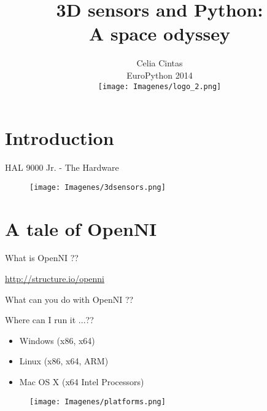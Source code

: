\documentclass[bigger]{beamer}
\begin{document}
\normalfont\ECFAugie

\title{3D sensors and Python:\\ A space odyssey \\[0.5cm]}
\subtitle{Celia Cintas \\[0.2cm] EuroPython 2014 \\[0.3cm]
\texttt{[image: Imagenes/logo\_2.png]}}

\begin{frame}
\titlepage
\end{frame}
\section{Introduction}


\begin{frame}[t]{\ECFAugie HAL 9000 Jr. - The Hardware}
\begin{figure}
		\texttt{[image: Imagenes/3dsensors.png]}
\end{figure}
\end{frame}

\section{A tale of OpenNI}
\begin{frame}[fragile]{\ECFAugie What is OpenNI ??}
\begin{center}
\url{http://structure.io/openni}
\end{center}
\end{frame}

\begin{frame}{\ECFAugie What can you do with OpenNI ??}
\end{frame}

\begin{frame}{\ECFAugie Where can I run it ...??}
\begin{minipage}{0.47\textwidth}
\begin{itemize}
	\item Windows (x86, x64)
	\item Linux (x86, x64, ARM)
	\item Mac OS X (x64 Intel Processors)
\end{itemize}
\end{minipage}
\begin{minipage}{0.5\textwidth}
\begin{figure}[h]
		\texttt{[image: Imagenes/platforms.png]}
\end{figure}
\end{minipage}
\end{frame}
\end{document}
